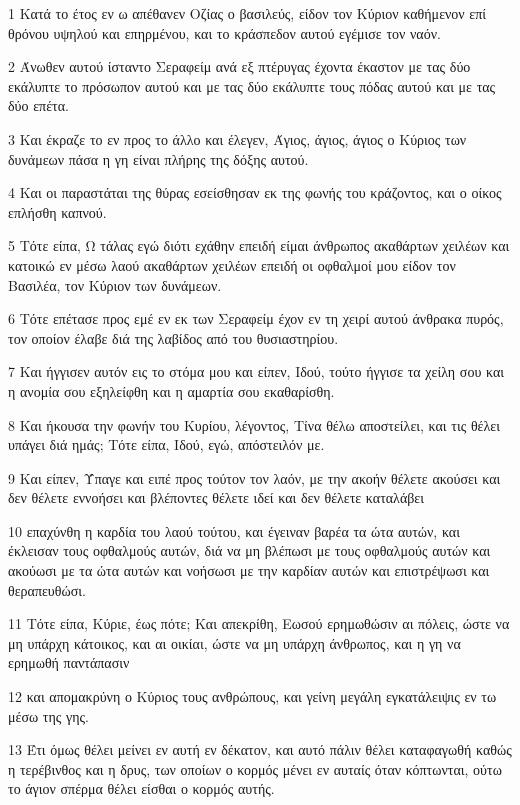\par 1 Κατά το έτος εν ω απέθανεν Οζίας ο βασιλεύς, είδον τον Κύριον καθήμενον επί θρόνου υψηλού και επηρμένου, και το κράσπεδον αυτού εγέμισε τον ναόν.
\par 2 Άνωθεν αυτού ίσταντο Σεραφείμ ανά εξ πτέρυγας έχοντα έκαστον με τας δύο εκάλυπτε το πρόσωπον αυτού και με τας δύο εκάλυπτε τους πόδας αυτού και με τας δύο επέτα.
\par 3 Και έκραζε το εν προς το άλλο και έλεγεν, Άγιος, άγιος, άγιος ο Κύριος των δυνάμεων πάσα η γη είναι πλήρης της δόξης αυτού.
\par 4 Και οι παραστάται της θύρας εσείσθησαν εκ της φωνής του κράζοντος, και ο οίκος επλήσθη καπνού.
\par 5 Τότε είπα, Ω τάλας εγώ διότι εχάθην επειδή είμαι άνθρωπος ακαθάρτων χειλέων και κατοικώ εν μέσω λαού ακαθάρτων χειλέων επειδή οι οφθαλμοί μου είδον τον Βασιλέα, τον Κύριον των δυνάμεων.
\par 6 Τότε επέτασε προς εμέ εν εκ των Σεραφείμ έχον εν τη χειρί αυτού άνθρακα πυρός, τον οποίον έλαβε διά της λαβίδος από του θυσιαστηρίου.
\par 7 Και ήγγισεν αυτόν εις το στόμα μου και είπεν, Ιδού, τούτο ήγγισε τα χείλη σου και η ανομία σου εξηλείφθη και η αμαρτία σου εκαθαρίσθη.
\par 8 Και ήκουσα την φωνήν του Κυρίου, λέγοντος, Τίνα θέλω αποστείλει, και τις θέλει υπάγει διά ημάς; Τότε είπα, Ιδού, εγώ, απόστειλόν με.
\par 9 Και είπεν, Ύπαγε και ειπέ προς τούτον τον λαόν, με την ακοήν θέλετε ακούσει και δεν θέλετε εννοήσει και βλέποντες θέλετε ιδεί και δεν θέλετε καταλάβει
\par 10 επαχύνθη η καρδία του λαού τούτου, και έγειναν βαρέα τα ώτα αυτών, και έκλεισαν τους οφθαλμούς αυτών, διά να μη βλέπωσι με τους οφθαλμούς αυτών και ακούωσι με τα ώτα αυτών και νοήσωσι με την καρδίαν αυτών και επιστρέψωσι και θεραπευθώσι.
\par 11 Τότε είπα, Κύριε, έως πότε; Και απεκρίθη, Εωσού ερημωθώσιν αι πόλεις, ώστε να μη υπάρχη κάτοικος, και αι οικίαι, ώστε να μη υπάρχη άνθρωπος, και η γη να ερημωθή παντάπασιν
\par 12 και απομακρύνη ο Κύριος τους ανθρώπους, και γείνη μεγάλη εγκατάλειψις εν τω μέσω της γης.
\par 13 Έτι όμως θέλει μείνει εν αυτή εν δέκατον, και αυτό πάλιν θέλει καταφαγωθή καθώς η τερέβινθος και η δρυς, των οποίων ο κορμός μένει εν αυταίς όταν κόπτωνται, ούτω το άγιον σπέρμα θέλει είσθαι ο κορμός αυτής.

